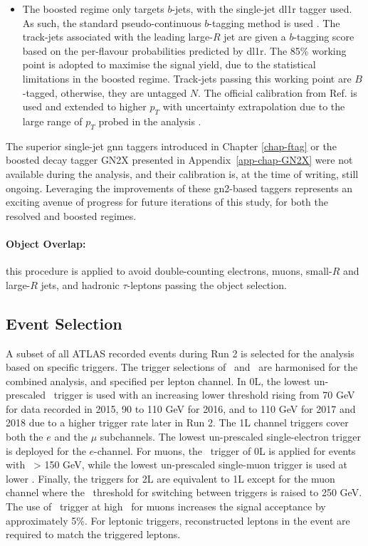 \begin{itemize}[leftmargin=*]
\item The boosted regime only targets $b$-jets, with the single-jet \gls{dl1r} tagger used. As such, the standard pseudo-continuous $b$-tagging method is used \cite{atlas:FTAGRUN2}. The track-jets associated with the leading large-$R$ jet are given a $b$-tagging score based on the per-flavour probabilities predicted by \gls{dl1r}. The 85\% working point is adopted to maximise the signal yield, due to the statistical limitations in the boosted regime. Track-jets passing this working point are $B$-tagged, otherwise, they are untagged $N$. The official calibration from Ref. \cite{atlas:FTAGRUN2} is used and extended to higher $p_T$ with uncertainty extrapolation due to the large range of $p_T$ probed in the analysis \cite{cjettaggingCalib, ATLAS:2023lwk}.
\end{itemize}
The superior single-jet \gls{gnn} taggers introduced in Chapter \ref{chap-ftag} or the boosted decay tagger GN2X \cite{ATL-PHYS-PUB-2023-021} presented in Appendix~\ref{app-chap-GN2X} were not available during the analysis, and their calibration is, at the time of writing, still ongoing. Leveraging the improvements of these \gls{gn2}-based taggers represents an exciting avenue of progress for future iterations of this study, for both the resolved and boosted regimes. 

\paragraph{Object Overlap:} this procedure is applied to avoid double-counting electrons, muons, small-$R$ and large-$R$ jets, and hadronic $\tau$-leptons passing the object selection.

\subsection{Event Selection}\label{sec-regimeCat}
A subset of all ATLAS recorded events during Run 2 is selected for the analysis based on specific triggers. The trigger selections of \vhb\ and \vhc\ are harmonised for the combined analysis, and specified per lepton channel. In 0L, the lowest un-prescaled \etm\ trigger is used with an increasing lower threshold rising from 70 GeV for data recorded in 2015, 90 to 110 GeV for 2016, and to 110 GeV for 2017 and 2018 due to a higher trigger rate later in Run 2. The 1L channel triggers cover both the $e$ and the $\mu$ subchannels. The lowest un-prescaled single-electron trigger is deployed for the $e$-channel. For muons, the \etm\ trigger of 0L is applied for events with \ptv\ > 150 GeV, while the lowest un-prescaled single-muon trigger is used at lower \ptv. Finally, the triggers for 2L are equivalent to 1L except for the muon channel where the \ptv\ threshold for switching between triggers is raised to 250 GeV. The use of \etm\ trigger at high \ptv\ for muons increases the signal acceptance by approximately 5\%. For leptonic triggers, reconstructed leptons in the event are required to match the triggered leptons. \\ 

